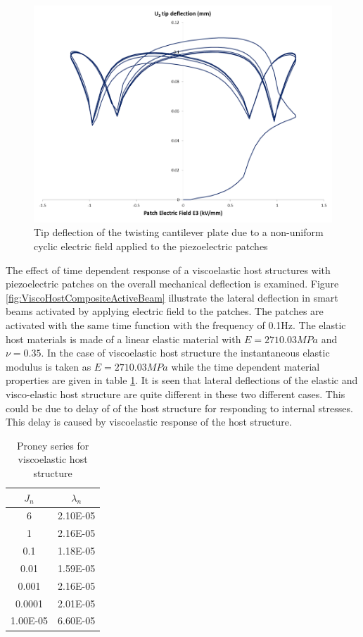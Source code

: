 \begin{figure} 
\centering
\includegraphics[width=6.0in]{./chap_2_pol_sw/figures/Fig14_tiptwistingcompositeactivebeam.png}
\caption{Tip deflection of the twisting cantilever plate due to a non-uniform cyclic electric field applied to the piezoelectric patches}
\label{fig:Fig14_tiptwistingcompositeactivebeam} 
\end{figure}

The effect of time dependent response of a viscoelastic host structures with piezoelectric patches on the overall mechanical deflection is examined. 
Figure \ref{fig:ViscoHostCompositeActiveBeam} illustrate the lateral deflection in smart beams activated by applying electric field to the patches. 
The patches are activated with the same time function with the frequency of 0.1Hz. 
The elastic host materials is made of a linear elastic material with $E=2710.03 MPa$ and $\nu = 0.35$. 
In the case of viscoelastic host structure the instantaneous elastic modulus is taken as $E=2710.03 MPa$ while the time dependent material properties are given in table \ref{table:Proney_Host}. 
It is seen that lateral deflections of the elastic and visco-elastic host structure are quite different in these two different cases. 
This could be due to delay of of the host structure for responding to internal stresses. 
This delay is caused by viscoelastic response of the host structure.

\begin{table}
\caption{Proney series for viscoelastic host structure}
\centering
\begin{tabular}{c c}
\hline
$J_n$&$\lambda_n$\\ \hline
6&2.10E-05\\ 
1&2.16E-05\\ 
0.1&1.18E-05\\ 
0.01&1.59E-05\\ 
0.001&2.16E-05\\ 
0.0001&2.01E-05\\ 
1.00E-05&6.60E-05\\ \hline
\end{tabular}
\label{table:Proney_Host}
\end{table}

